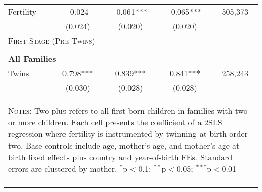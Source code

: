 \begin{table}[!htbp]
\begin{tabular}{lcccc}
Fertility&-0.024&-0.061***&-0.065***&505,373\\
         &(0.024)&(0.020)&(0.020)&\\
\midrule\multicolumn{5}{l}{\textsc{First Stage (Pre-Twins)}}\\ 
&&&&\\
\multicolumn{5}{l}{\textbf{All Families}}\\ 
Twins&0.798***&0.839***&0.841***&258,243\\
         &(0.030)&(0.028)&(0.028)&\\
\hline\multicolumn{5}{p{10cm}}{\begin{footnotesize}\textsc{Notes:} Two-plus refers to all first-born children in families with two or more children.  Each cell presents the coefficient of a 2SLS regression where fertility is instrumented by twinning at birth order two.  Base controls include age, mother's age, and mother's age at birth fixed effects plus country and year-of-birth FEs.  Standard errors are clustered by mother. 
$^{*}$p$<$0.1; $^{**}$p$<$0.05; $^{***}$p$<$0.01\end{footnotesize}}
\\\bottomrule\normalsize\end{tabular}\end{table} 
